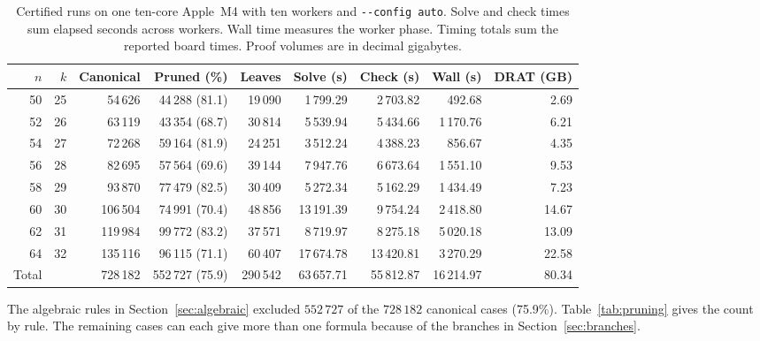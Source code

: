 \documentclass[11pt,a4paper]{article}
\theoremstyle{result}
\theoremstyle{definition}
\theoremstyle{remark}
\begin{document}
\begin{table}[!htbp]
\centering\small
\caption{Certified runs on one ten-core Apple~M4 with ten workers
  and \texttt{-{}-config auto}. Solve and check times sum elapsed
  seconds across workers. Wall time measures the worker phase.
  Timing totals sum the reported board times. Proof volumes are in
  decimal gigabytes.}
\label{tab:certified}
\setlength{\tabcolsep}{4.2pt}
\renewcommand{\arraystretch}{1.18}
\begin{tabular}{@{}rrrrrrrrr@{}}
\toprule
$n$ & $k$ & Canonical & Pruned (\%) & Leaves & Solve (s) & Check (s) & Wall (s) & DRAT (GB) \\
\midrule
50 & 25 & 54\,626 & 44\,288 (81.1) & 19\,090 & 1\,799.29 & 2\,703.82 & 492.68 & 2.69 \\
52 & 26 & 63\,119 & 43\,354 (68.7) & 30\,814 & 5\,539.94 & 5\,434.66 & 1\,170.76 & 6.21 \\
54 & 27 & 72\,268 & 59\,164 (81.9) & 24\,251 & 3\,512.24 & 4\,388.23 & 856.67 & 4.35 \\
56 & 28 & 82\,695 & 57\,564 (69.6) & 39\,144 & 7\,947.76 & 6\,673.64 & 1\,551.10 & 9.53 \\
58 & 29 & 93\,870 & 77\,479 (82.5) & 30\,409 & 5\,272.34 & 5\,162.29 & 1\,434.49 & 7.23 \\
60 & 30 & 106\,504 & 74\,991 (70.4) & 48\,856 & 13\,191.39 & 9\,754.24 & 2\,418.80 & 14.67 \\
62 & 31 & 119\,984 & 99\,772 (83.2) & 37\,571 & 8\,719.97 & 8\,275.18 & 5\,020.18 & 13.09 \\
64 & 32 & 135\,116 & 96\,115 (71.1) & 60\,407 & 17\,674.78 & 13\,420.81 & 3\,270.29 & 22.58 \\
\midrule
Total & & 728\,182 & 552\,727 (75.9) & 290\,542 & 63\,657.71 & 55\,812.87 & 16\,214.97 & 80.34 \\
\bottomrule
\end{tabular}
\end{table}

The algebraic rules in Section~\ref{sec:algebraic} excluded
$552\,727$ of the $728\,182$ canonical cases (75.9\%).
Table~\ref{tab:pruning} gives the count by rule. The remaining cases
can each give more than one formula because of the branches in
Section~\ref{sec:branches}.
\end{document}
